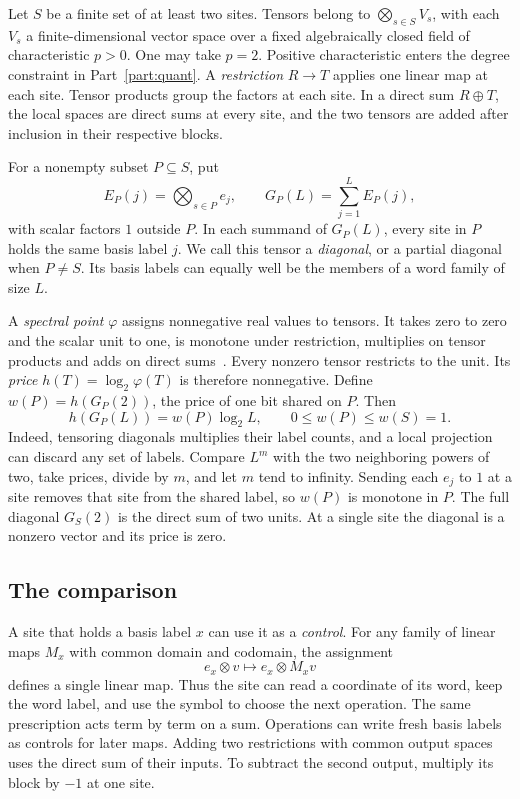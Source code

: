 Let \(S\) be a finite set of at least two sites. Tensors belong to
\(\bigotimes_{s\in S}V_s\), with each \(V_s\) a finite-dimensional
vector space over a fixed algebraically closed field of characteristic
\(p>0\). One may take \(p=2\). Positive characteristic enters the degree
constraint in Part~\ref{part:quant}. A \emph{restriction}
\(R\longrightarrow T\) applies one linear map at each site. Tensor
products group the factors at each site. In a direct sum \(R\oplus T\),
the local spaces are direct sums at every site, and the two tensors are
added after inclusion in their respective blocks.

For a nonempty subset \(P\subseteq S\), put
\[
       E_P(j)=\bigotimes_{s\in P}e_j,\qquad
       G_P(L)=\sum_{j=1}^{L}E_P(j),
\]
with scalar factors \(1\) outside \(P\). In each summand of \(G_P(L)\),
every site in \(P\) holds the same basis label \(j\). We call this tensor
a \emph{diagonal}, or a partial diagonal when \(P\ne S\). Its basis
labels can equally well be the members of a word family of size \(L\).

A \emph{spectral point} \(\varphi\) assigns nonnegative real values to
tensors. It takes zero to zero and the scalar unit to one, is monotone
under restriction, multiplies on tensor products and adds on direct
sums~\cite{Strassen}. Every nonzero tensor restricts to the unit.
Its \emph{price} \(h(T)=\log_2\varphi(T)\) is therefore nonnegative.
Define \(w(P)=h(G_P(2))\), the price of one bit shared on \(P\). Then
\begin{equation}\label{eq:price}
       h(G_P(L))=w(P)\log_2 L,\qquad 0\le w(P)\le w(S)=1 .
\end{equation}
Indeed, tensoring diagonals multiplies their label counts, and a local
projection can discard any set of labels. Compare \(L^m\) with the
two neighboring powers of two, take prices, divide by \(m\), and let
\(m\) tend to infinity. Sending each \(e_j\) to \(1\) at a site removes
that site from the shared label, so \(w(P)\) is monotone in \(P\).
The full diagonal \(G_S(2)\) is the direct sum of two units. At a
single site the diagonal is a nonzero vector and its price is zero.

\subsection{The comparison}
A site that holds a basis label \(x\) can use it as a \emph{control}.
For any family of linear maps \(M_x\) with common domain and codomain,
the assignment
\[
             e_x\otimes v\longmapsto e_x\otimes M_xv
\]
defines a single linear map. Thus the site can read a coordinate of
its word, keep the word label, and use the symbol to choose the next
operation. The same prescription acts term by term on a sum. Operations
can write fresh basis labels as controls for later maps. Adding two
restrictions with common output spaces uses the direct sum of their
inputs. To subtract the second output, multiply its block by \(-1\)
at one site.

